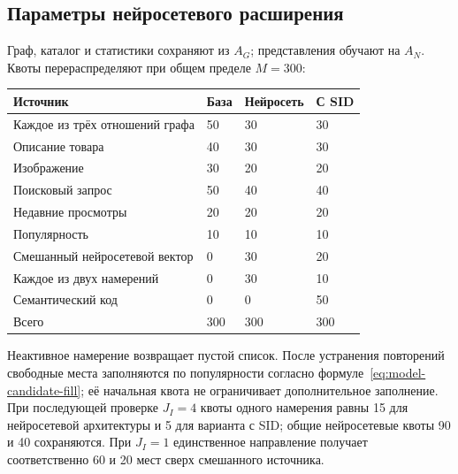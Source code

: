 \documentclass[12pt,a4paper]{article}
\theoremstyle{plainru}
\begin{document}
\subsection{Параметры нейросетевого расширения}\label{app:neural-config}

Граф, каталог и статистики сохраняют из $A_G$; представления обучают
на $A_N$. Квоты перераспределяют при общем пределе $M=300$:
\begin{longtable}{L{0.38\textwidth}L{0.15\textwidth}L{0.15\textwidth}L{0.17\textwidth}}
\toprule Источник & База & Нейросеть & С SID \\\midrule\endhead
Каждое из трёх отношений графа & 50 & 30 & 30 \\
Описание товара & 40 & 30 & 30 \\
Изображение & 30 & 20 & 20 \\
Поисковый запрос & 50 & 40 & 40 \\
Недавние просмотры & 20 & 20 & 20 \\
Популярность & 10 & 10 & 10 \\
Смешанный нейросетевой вектор & 0 & 30 & 20 \\
Каждое из двух намерений & 0 & 30 & 10 \\
Семантический код & 0 & 0 & 50 \\
\midrule Всего & 300 & 300 & 300 \\
\bottomrule
\end{longtable}
Неактивное намерение возвращает пустой список. После устранения
повторений свободные места заполняются по популярности согласно
формуле~\eqref{eq:model-candidate-fill}; её начальная квота
не ограничивает дополнительное заполнение.
При последующей проверке $J_I=4$ квоты одного намерения равны 15
для нейросетевой архитектуры и 5 для варианта с SID; общие нейросетевые
квоты 90 и 40 сохраняются. При $J_I=1$ единственное направление
получает соответственно 60 и 20 мест сверх смешанного источника.
\end{document}
